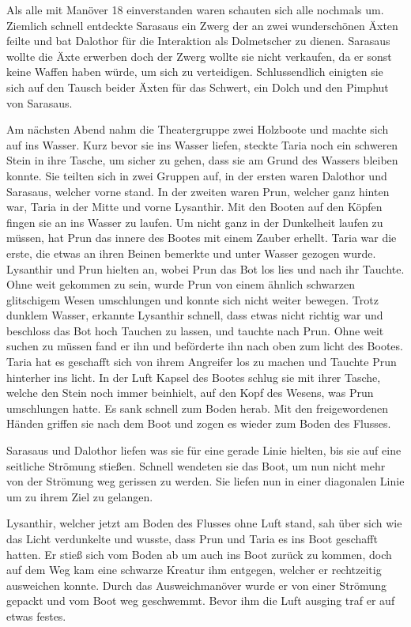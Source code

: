 \documentclass[10pt,twoside,twocolumn,openany]{book}
\begin{document}
	Als alle mit Manöver 18 einverstanden waren schauten sich alle nochmals um. Ziemlich schnell entdeckte Sarasaus ein Zwerg der an zwei wunderschönen Äxten feilte und bat Dalothor für die Interaktion als Dolmetscher zu dienen. Sarasaus wollte die Äxte erwerben doch der Zwerg wollte sie nicht verkaufen, da er sonst keine Waffen haben würde, um sich zu verteidigen. Schlussendlich einigten sie sich auf den Tausch beider Äxten für das Schwert, ein Dolch und den Pimphut von Sarasaus. 
		
	Am nächsten Abend nahm die Theatergruppe zwei Holzboote und machte sich auf ins Wasser. Kurz bevor sie ins Wasser liefen, steckte Taria noch ein schweren Stein in ihre Tasche, um sicher zu gehen, dass sie am Grund des Wassers bleiben konnte. Sie teilten sich in zwei Gruppen auf, in der ersten waren Dalothor und Sarasaus, welcher vorne stand. In der zweiten waren Prun, welcher ganz hinten war, Taria in der Mitte und vorne Lysanthir. Mit den Booten auf den Köpfen fingen sie an ins Wasser zu laufen. Um nicht ganz in der Dunkelheit laufen zu müssen, hat Prun das innere des Bootes mit einem Zauber erhellt. Taria war die erste, die etwas an ihren Beinen bemerkte und unter Wasser gezogen wurde. Lysanthir und Prun hielten an, wobei Prun das Bot los lies und nach ihr Tauchte. Ohne weit gekommen zu sein, wurde Prun von einem ähnlich schwarzen glitschigem Wesen umschlungen und konnte sich nicht weiter bewegen. Trotz dunklem Wasser, erkannte Lysanthir schnell, dass etwas nicht richtig war und beschloss das Bot hoch Tauchen zu lassen, und tauchte nach Prun. Ohne weit suchen zu müssen fand er ihn und beförderte ihn nach oben zum licht des Bootes. Taria hat es geschafft sich von ihrem Angreifer los zu machen und Tauchte Prun hinterher ins licht. In der Luft Kapsel des Bootes schlug sie mit ihrer Tasche, welche den Stein noch immer beinhielt, auf den Kopf des Wesens, was Prun umschlungen hatte. Es sank schnell zum Boden herab. Mit den freigewordenen Händen griffen sie nach dem Boot und zogen es wieder zum Boden des Flusses. 
	
	Sarasaus und Dalothor liefen was sie für eine gerade Linie hielten, bis sie auf eine seitliche Strömung stießen. Schnell wendeten sie das Boot, um nun nicht mehr von der Strömung weg gerissen zu werden. Sie liefen nun in einer diagonalen Linie um zu ihrem Ziel zu gelangen. 
	
	Lysanthir, welcher jetzt am Boden des Flusses ohne Luft stand, sah über sich wie das Licht verdunkelte und wusste, dass Prun und Taria es ins Boot geschafft hatten. Er stieß sich vom Boden ab um auch ins Boot zurück zu kommen, doch auf dem Weg kam eine schwarze Kreatur ihm entgegen, welcher er rechtzeitig ausweichen konnte. Durch das Ausweichmanöver wurde er von einer Strömung gepackt und vom Boot weg geschwemmt. Bevor ihm die Luft ausging traf er auf etwas festes.
	
\end{document}
